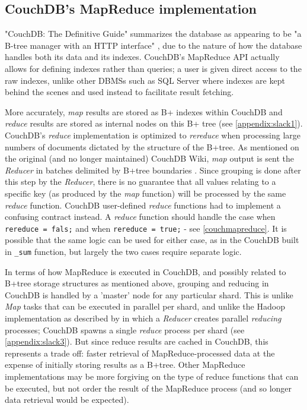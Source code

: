 \subsection{CouchDB's MapReduce implementation}
"CouchDB: The Definitive Guide" summarizes the database as appearing to be "a B-tree manager with an HTTP interface" \cite{couchguide}, due to the nature of how the database handles both its data and its indexes. CouchDB's MapReduce API actually allows for defining indexes rather than queries; a user is given direct access to the raw indexes, unlike other DBMSs such as SQL Server where indexes are kept behind the scenes and used instead to facilitate result fetching.

More accurately, \textit{map} results are stored as B+ indexes within CouchDB and \textit{reduce} results are stored as internal nodes on this B+ tree (see \ref{appendix:slack1}). CouchDB's \textit{reduce} implementation is optimized to \textit{rereduce} when processing large numbers of documents dictated by the structure of the B+tree. As mentioned on the original (and no longer maintained) CouchDB Wiki, \textit{map} output is sent the \textit{Reducer} in batches delimited by B+tree boundaries \cite{couchwiki}. Since grouping is done after this step by the \textit{Reducer}, there is no guarantee that all values relating to a specific key (as produced by the \textit{map} function) will be processed by the same \textit{reduce} function. CouchDB user-defined \textit{reduce} functions had to implement a confusing contract instead. A \textit{reduce} function should handle the case when \texttt{rereduce = fals;} and when \texttt{rereduce = true;} - see \ref{couchmapreduce}. It is possible that the same logic can be used for either case, as in the CouchDB built in \texttt{_sum} function, but largely the two cases require separate logic.

In terms of how MapReduce is executed in CouchDB, and possibly related to B+tree storage structures as mentioned above, grouping and reducing in CouchDB is handled by a 'master' node for any particular shard. This is unlike \textit{Map} tasks that can be executed in parallel per shard, and unlike the Hadoop implementation as described by \cite{chandar2010} in which a \textit{Reducer} creates parallel \textit{reducing} processes; CouchDB spawns a single \textit{reduce} process per shard (see \ref{appendix:slack3}). But since reduce results are cached in CouchDB, this represents a trade off: faster retrieval of MapReduce-processed data at the expense of initially storing results as a B+tree. Other MapReduce implementations may be more forgiving on the type of reduce functions that can be executed, but not order the result of the MapReduce process (and so longer data retrieval would be expected).

